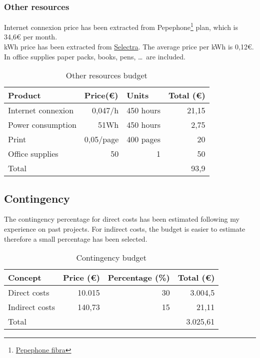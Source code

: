 \subsubsection{Other resources}
Internet connexion price has been extracted from Pepephone\footnote{\href{https://www.pepephone.com/internet-en-casa}{Pepephone fibra}} plan, which is 34,6€ per month. \\
kWh price has been extracted from \href{https://tarifasgasluz.com/faq/precio-kwh-espana-2017}{Selectra}. The average price per kWh is 0,12€.
In office supplies paper packs, books, pens, \ldots \ are included.
\begin{table}[h!]
	\centering
	\begin{tabular}{|l|r|r|r|}
		\hline
		\multicolumn{1}{|l|}{Product} & \multicolumn{1}{l|}{Price(€)} & \multicolumn{1}{l|}{Units} & \multicolumn{1}{l|}{Total (€)} \\ \hline
		Internet connexion & 0,047/h & 450 hours & 21,15\\ \hline
		Power consumption & 51Wh & 450 hours & 2,75 \\ \hline
		Print & 0,05/page & 400 pages & 20 \\ \hline
		Office supplies & 50 & 1 & 50 \\ \hline\hline
		Total & \multicolumn{3}{r|}{93,9}                                                                        \\ \hline
	\end{tabular}
	\caption{Other resources budget}
	\label{OtherResources}
\end{table}

\subsection{Contingency}
The contingency percentage for direct costs has been estimated following my experience on past projects. For indirect costs, the budget is easier to estimate therefore a small percentage has been selected.
\begin{table}[h!]
	\centering
	\begin{tabular}{|l|r|r|r|}
		\hline
		\multicolumn{1}{|l|}{Concept} & \multicolumn{1}{l|}{Price (€)} & \multicolumn{1}{l|}{Percentage (\%)} & \multicolumn{1}{l|}{Total (€)} \\ \hline
		Direct costs & 10.015 & 30 & 3.004,5 \\ \hline
		Indirect costs & 140,73 & 15 & 21,11\\ \hline\hline
		Total & \multicolumn{3}{r|}{3.025,61} \\ \hline
	\end{tabular}
	\caption{Contingency budget}
	\label{Contingency}
\end{table}


